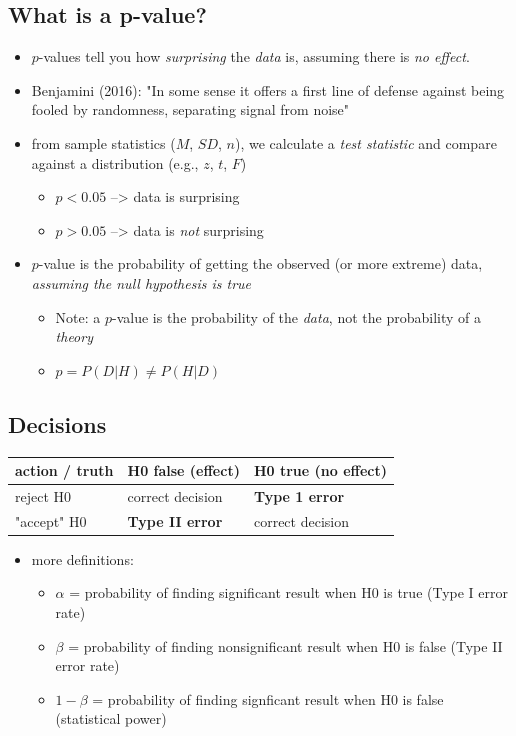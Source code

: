 \documentclass[11pt]{article}
\begin{document}
\subsection*{What is a p-value?}
\label{sec-2-1}
\begin{itemize}
\item $p$-values tell you how \emph{surprising} the \emph{data} is, assuming there is \emph{no effect}.
\item Benjamini (2016): "In some sense it offers a first line of defense against being fooled by randomness, separating signal from noise"
\item from sample statistics ($M$, $SD$, $n$), we calculate a \emph{test statistic} and compare against a distribution (e.g., $z$, $t$, $F$)
\begin{itemize}
\item $p<0.05$ --> data is surprising
\item $p>0.05$ --> data is \emph{not} surprising
\end{itemize}
\item $p$-value is the probability of getting the observed (or more extreme) data, \emph{assuming the null hypothesis is true}
\begin{itemize}
\item Note: a $p$-value is the probability of the \emph{data}, not the probability of a \emph{theory}
\item $p = P(D|H) \neq P(H|D)$
\end{itemize}
\end{itemize}

\subsection*{Decisions}
\label{sec-2-2}
\begin{center}
\begin{tabular}{lll}
action / truth & H0 false (effect) & H0 true (no effect)\\
\hline
reject H0 & correct decision & \textbf{Type 1 error}\\
"accept" H0 & \textbf{Type II error} & correct decision\\
\end{tabular}
\end{center}

\begin{itemize}
\item more definitions:
\begin{itemize}
\item $\alpha$ = probability of finding significant result when H0 is true (Type I error rate)
\item $\beta$ = probability of finding nonsignificant result when H0 is false (Type II error rate)
\item $1-\beta$ = probability of finding signficant result when H0 is false (statistical power)
\end{itemize}
\end{itemize}
\end{document}
